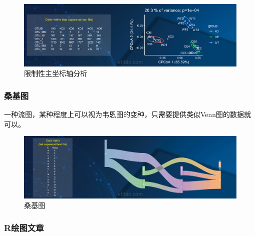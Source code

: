 \documentclass[]{article}
\numberwithin{figure}{section}
\numberwithin{table}{section}
\theoremstyle{definition}
\theoremstyle{definition}
\theoremstyle{definition}
\theoremstyle{remark}
\begin{document}
\begin{figure}[H]

{\centering \includegraphics[width=0.95\linewidth,height=0.7\textheight,keepaspectratio]{images/CPcOA} 

}

\caption{限制性主坐标轴分析}\label{fig:unnamed-chunk-268}
\end{figure}

\subsubsection{桑基图}

一种流图，某种程度上可以视为韦恩图的变种，只需要提供类似Venn图的数据就可以。

\begin{figure}[H]

{\centering \includegraphics[width=0.95\linewidth,height=0.7\textheight,keepaspectratio]{images/sangshen} 

}

\caption{桑基图}\label{fig:unnamed-chunk-269}
\end{figure}

\subsubsection{R绘图文章}\label{r}
\end{document}
